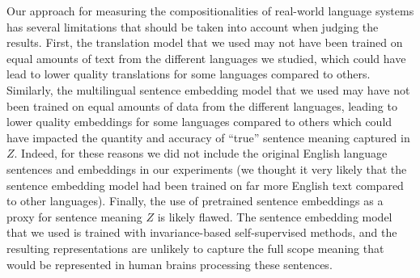 \documentclass{article}
\begin{document}
\begin{appendices}
Our approach for measuring the compositionalities of real-world language systems has several limitations that should be taken into account when judging the results. First, the translation model that we used may not have been trained on equal amounts of text from the different languages we studied, which could have lead to lower quality translations for some languages compared to others. Similarly, the multilingual sentence embedding model that we used may have not been trained on equal amounts of data from the different languages, leading to lower quality embeddings for some languages compared to others which could have impacted the quantity and accuracy of ``true'' sentence meaning captured in $Z$. Indeed, for these reasons we did not include the original English language sentences and embeddings in our experiments (we thought it very likely that the sentence embedding model had been trained on far more English text compared to other languages). Finally, the use of pretrained sentence embeddings as a proxy for sentence meaning $Z$ is likely flawed. The sentence embedding model that we used is trained with invariance-based self-supervised methods, and the resulting representations are unlikely to capture the full scope meaning that would be represented in human brains processing these sentences.


\end{appendices}
\end{document}
